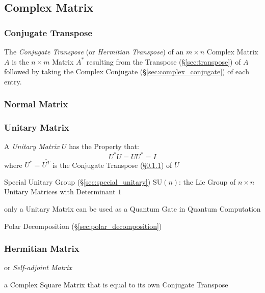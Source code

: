 \subsection{Complex Matrix}\label{sec:complex_matrix}

\subsubsection{Conjugate Transpose}\label{sec:conjugate_transpose}

The \emph{Conjugate Transpose} (or \emph{Hermitian Transpose}) of an $m \times
n$ Complex Matrix $A$ is the $n \times m$ Matrix $A^*$ resulting from the
Transpose (\S\ref{sec:transpose}) of $A$ followed by taking the Complex
Conjugate (\S\ref{sec:complex_conjugate}) of each entry.



\subsubsection{Normal Matrix}\label{sec:normal_matrix}

\subsubsection{Unitary Matrix}\label{sec:unitary_matrix}

A \emph{Unitary Matrix} $U$ has the Property that:
\[
  U^*U = UU^* = I
\]
where $U^* = \overline{U^T}$ is the Conjugate Transpose
(\S\ref{sec:conjugate_transpose}) of $U$

\fist Special Unitary Group (\S\ref{sec:special_unitary})
$\mathrm{SU}(n)$: the Lie Group of $n \times n$ Unitary Matrices with
Determinant $1$

only a Unitary Matrix can be used as a Quantum Gate in Quantum Computation

Polar Decomposition (\S\ref{sec:polar_decomposition})



\subsubsection{Hermitian Matrix}\label{sec:hermitian_matrix}

or \emph{Self-adjoint Matrix}

a Complex Square Matrix that is equal to its own Conjugate Transpose

